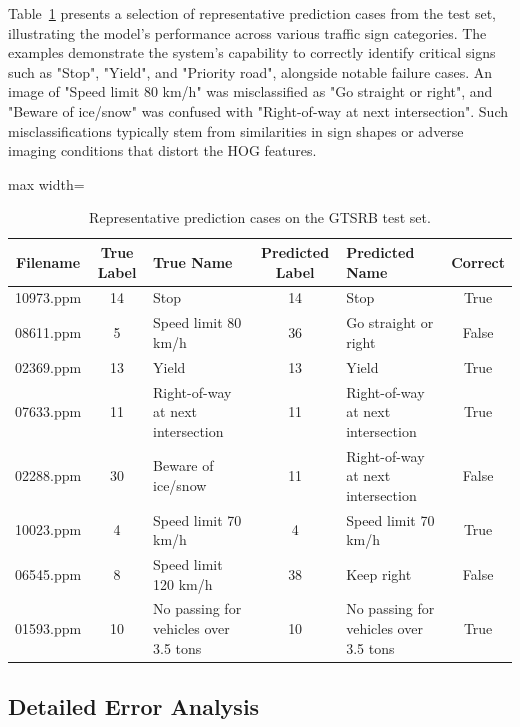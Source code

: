 \documentclass[11pt,a4paper,twoside]{article}
\begin{document}
Table~\ref{tab:representative_prediction_cases} presents a selection of representative prediction cases from the test set, illustrating the model's performance across various traffic sign categories. The examples demonstrate the system's capability to correctly identify critical signs such as "Stop", "Yield", and "Priority road", alongside notable failure cases. An image of "Speed limit 80 km/h" was misclassified as "Go straight or right", and "Beware of ice/snow" was confused with "Right-of-way at next intersection". Such misclassifications typically stem from similarities in sign shapes or adverse imaging conditions that distort the HOG features.

\begin{table}[htbp]
    \centering
    \scriptsize
    \setlength{\tabcolsep}{4.0pt}
    \renewcommand{\arraystretch}{1.1}
    \begin{adjustbox}{max width=\linewidth}
    \begin{tabular}{c c p{4.0cm} c p{4.0cm} c}
    \toprule
    \textbf{Filename} & \textbf{True Label} & \textbf{True Name} & \textbf{Predicted Label} & \textbf{Predicted Name} & \textbf{Correct} \\
    \midrule
    10973.ppm & 14 & Stop & 14 & Stop & True \\
    08611.ppm & 5 & Speed limit 80 km/h & 36 & Go straight or right & False \\
    02369.ppm & 13 & Yield & 13 & Yield & True \\
    07633.ppm & 11 & Right-of-way at next intersection & 11 & Right-of-way at next intersection & True \\
    02288.ppm & 30 & Beware of ice/snow & 11 & Right-of-way at next intersection & False \\
    10023.ppm & 4 & Speed limit 70 km/h & 4 & Speed limit 70 km/h & True \\
    06545.ppm & 8 & Speed limit 120 km/h & 38 & Keep right & False \\
    01593.ppm & 10 & No passing for vehicles over 3.5 tons & 10 & No passing for vehicles over 3.5 tons & True \\
    \bottomrule
    \end{tabular}
    \end{adjustbox}
    \caption{Representative prediction cases on the GTSRB test set.}
    \label{tab:representative_prediction_cases}
\end{table}

\subsection{Detailed Error Analysis}
\end{document}
